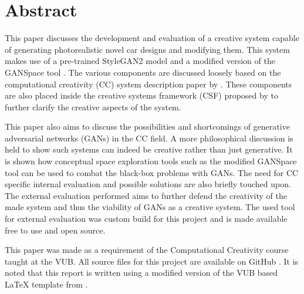\chapter*{Abstract}


This paper discusses the development and evaluation of a creative system capable of generating photorealistic novel car designs and modifying them.
This system makes use of a pre-trained StyleGAN2 model \citep{stylegan2} and a modified version of the GANSpace tool \citep{ganspace}.
The various components are discussed loosely based on the computational creativity (CC) system description paper by \citet{ventura}.
These components are also placed inside the creative systems framework (CSF) proposed by \citet{csf} to further clarify the creative aspects of the system.

This paper also aims to discuss the possibilities and shortcomings of generative adversarial networks (GANs) in the CC field.
A more philosophical discussion is held to show such systems can indeed be creative rather than just generative.
It is shown how conceptual space exploration tools such as the modified GANSpace tool can be used to combat the black-box problems with GANs.
The need for CC specific internal evaluation and possible solutions are also briefly touched upon.
The external evaluation performed aims to further defend the creativity of the made system and thus the viability of GANs as a creative system.
The used tool for external evaluation was custom build for this project and is made available free to use and open source.

This paper was made as a requirement of the Computational Creativity course taught at the VUB.
All source files for this project are available on GitHub \citep{github_project}.
It is noted that this report is written using a modified version of the VUB based \LaTeX{} template from \citet{latex_template}. 
